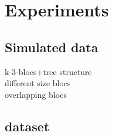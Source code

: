 \section{Experiments}
\label{experiments}

\subsection{Simulated data}
k-3-blocs+tree structure\\

different size blocs\\

overlapping blocs\\

\subsection{dataset}